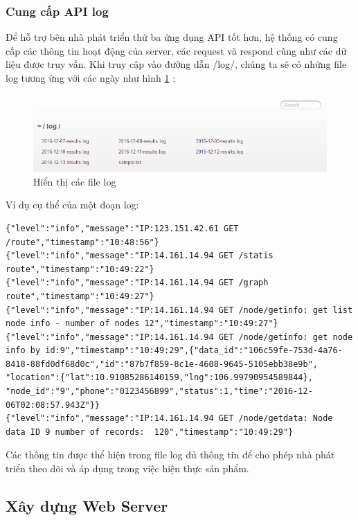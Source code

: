 \subsubsection*{Cung cấp API log}

Để hỗ trợ bên nhà phát triển thứ ba ứng dụng API tốt hơn, hệ thống có cung cấp các thông tin hoạt động của server, các request và respond cũng như các dữ liệu được truy vấn. Khi truy cập vào đường dẫn /log/, chúng ta sẽ có những file log tương ứng với các ngày như hình \ref{fig: log} :

\begin{figure}[H]
	\centering    
	\includegraphics[width=1.0\textwidth]{log}
	\caption[Hiển thị các file log]{Hiển thị các file log}
	\label{fig: log}
\end{figure}

Ví dụ cụ thể của một đoạn log:
\begin{lstlisting}
{"level":"info","message":"IP:123.151.42.61 GET /route","timestamp":"10:48:56"}
{"level":"info","message":"IP:14.161.14.94 GET /statis route","timestamp":"10:49:22"}
{"level":"info","message":"IP:14.161.14.94 GET /graph route","timestamp":"10:49:27"}
{"level":"info","message":"IP:14.161.14.94 GET /node/getinfo: get list node info - number of nodes 12","timestamp":"10:49:27"}
{"level":"info","message":"IP:14.161.14.94 GET /node/getinfo: get node info by id:9","timestamp":"10:49:29",{"data_id":"106c59fe-753d-4a76-8418-88fd0df68d0c","id":"87b7f859-8c1e-4608-9645-5105ebb38e9b", "location":{"lat":10.91085286140159,"lng":106.99790954589844}, "node_id":"9","phone":"0123456899","status":1,"time":"2016-12-06T02:08:57.943Z"}}
{"level":"info","message":"IP:14.161.14.94 GET /node/getdata: Node data ID 9 number of records:  120","timestamp":"10:49:29"}
\end{lstlisting}

Các thông tin được thể hiện trong file log đủ thông tin để cho phép nhà phát triển theo dõi và áp dụng trong việc hiện thực sản phẩm.
\subsection{Xây dựng Web Server}

